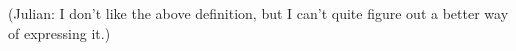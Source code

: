 \documentclass[12pt]{article}
\newcommand\intstep{\hspace{1.5mm}{\raisebox{3pt}{$\bullet$}}\hspace{-1.5mm}{\hookrightarrow}}
\newcommand\oiInternal[3]{#1,\ #2\ \intstep\ #3}
\newcommand\hoare[3]{\{#1\}\ #2\ \{#3\}}
\newcommand\internal[1]{\langle #1\ \texttt{internal}\rangle}
\newcommand\external[1]{\langle #1\ \texttt{external}\rangle}
\newtheorem{definition}{Definition}
\numberwithin{case}{lemma}
\numberwithin{case}{theorem}
\numberwithin{subcase}{case}
\begin{document}
{{\color{red}(Julian: I don't like the above definition, but I can't quite figure
out a better way of expressing it.)}

%
%
}
\end{document}
